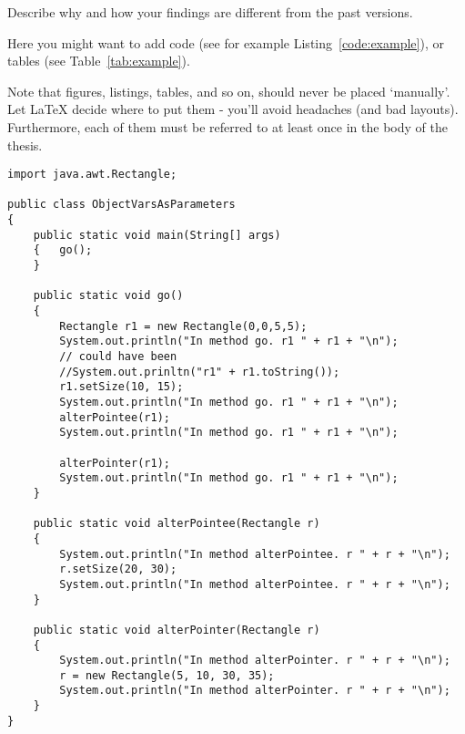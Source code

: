Describe why and how your findings are different from the past versions.

Here you might want to add code (see for example Listing~\ref{code:example}), or tables (see Table~\ref{tab:example}).

Note that figures, listings, tables, and so on, should never be placed `manually'. Let LaTeX decide where to put them - you'll avoid headaches (and bad layouts). Furthermore, each of them must be referred to at least once in the body of the thesis.

\begin{verbatim}
import java.awt.Rectangle;

public class ObjectVarsAsParameters
{	
    public static void main(String[] args)
    {	go();
    }
    
    public static void go()
    {	
        Rectangle r1 = new Rectangle(0,0,5,5);
        System.out.println("In method go. r1 " + r1 + "\n");
        // could have been 
        //System.out.prinltn("r1" + r1.toString());
        r1.setSize(10, 15);
        System.out.println("In method go. r1 " + r1 + "\n");
        alterPointee(r1);
        System.out.println("In method go. r1 " + r1 + "\n");
        
        alterPointer(r1);
        System.out.println("In method go. r1 " + r1 + "\n");
    }
    
    public static void alterPointee(Rectangle r)
    {	
        System.out.println("In method alterPointee. r " + r + "\n");
        r.setSize(20, 30);
        System.out.println("In method alterPointee. r " + r + "\n");
    }
    
    public static void alterPointer(Rectangle r)
    {	
        System.out.println("In method alterPointer. r " + r + "\n");
        r = new Rectangle(5, 10, 30, 35);
        System.out.println("In method alterPointer. r " + r + "\n");
    }
}
\end{verbatim}

